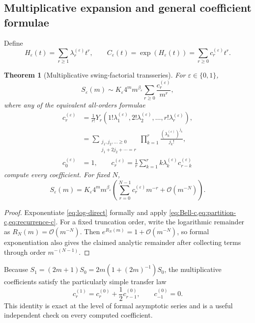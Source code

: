 \documentclass[11pt,a4paper]{article}
\theoremstyle{clean}
\newtheorem{theorem}{Theorem}[section]
\theoremstyle{definition}
\newcommand{\eps}{\varepsilon}
\newcommand{\be}{\beta}
\newcommand{\OO}{\mathcal O}
\begin{document}
\subsection{Multiplicative expansion and general coefficient formulae}

Define
\begin{equation}
 H_\eps(t)=\sum_{r\ge1}\lambda_r^{(\eps)}t^r,
 \qquad
 C_\eps(t)=\exp(H_\eps(t))=\sum_{r\ge0}c_r^{(\eps)}t^r.
 \label{eq:H-C-def}
\end{equation}

\begin{theorem}[Multiplicative swing-factorial transseries]
\label{thm:mult-direct}
For \(\eps\in\{0,1\}\),
\begin{equation}
 S_\eps(m)\sim K_\eps4^m m^{\be_\eps}
 \sum_{r\ge0}\frac{c_r^{(\eps)}}{m^r},
 \label{eq:mult-direct}
\end{equation}
where any of the equivalent all-orders formulae
\begin{align}
 c_r^{(\eps)}
 &=\frac1{r!}Y_r\!\left(
 1!\lambda_1^{(\eps)},2!\lambda_2^{(\eps)},\ldots,r!\lambda_r^{(\eps)}
 \right),
 \label{eq:c-Bell}\\
 &=\sum_{\substack{j_1,j_2,\ldots\ge0\\j_1+2j_2+\cdots=r}}
 \prod_{k=1}^r\frac{(\lambda_k^{(\eps)})^{j_k}}{j_k!},
 \label{eq:c-partition}\\
 c_0^{(\eps)}&=1,\qquad
 c_r^{(\eps)}=\frac1r\sum_{k=1}^r
 k\lambda_k^{(\eps)}c_{r-k}^{(\eps)}
 \label{eq:c-recurrence}
\end{align}
compute every coefficient.  For fixed \(N\),
\begin{equation}
 S_\eps(m)=K_\eps4^m m^{\be_\eps}
 \left(\sum_{r=0}^{N-1}c_r^{(\eps)}m^{-r}+\OO(m^{-N})\right).
 \label{eq:mult-remainder}
\end{equation}
\end{theorem}

\begin{proof}
Exponentiate \cref{eq:log-direct} formally and apply \cref{eq:Bell-c,eq:partition-c,eq:recurrence-c}.  For a fixed truncation order, write the logarithmic remainder as \(R_N(m)=\OO(m^{-N})\).  Then \(e^{R_N(m)}=1+\OO(m^{-N})\), so formal exponentiation also gives the claimed analytic remainder after collecting terms through order \(m^{-(N-1)}\).
\end{proof}

Because \(S_1=(2m+1)S_0=2m(1+(2m)^{-1})S_0\), the multiplicative coefficients satisfy the particularly simple transfer law
\begin{equation}
 \boxed{\displaystyle
 c_r^{(1)}=c_r^{(0)}+\frac12c_{r-1}^{(0)},
 \qquad c_{-1}^{(0)}=0.}
 \label{eq:c-transfer}
\end{equation}
This identity is exact at the level of formal asymptotic series and is a useful independent check on every computed coefficient.
\end{document}
